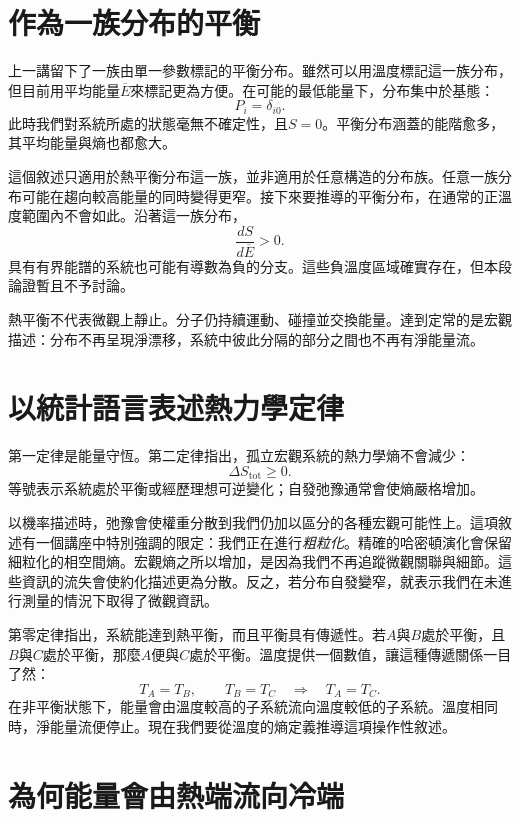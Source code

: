\section{作為一族分布的平衡}

上一講留下了一族由單一參數標記的平衡分布。雖然可以用溫度標記這一族分布，但目前用平均能量\(\overline E\)來標記更為方便。在可能的最低能量下，分布集中於基態：\[
 P_i=\delta_{i0}.
\]此時我們對系統所處的狀態毫無不確定性，且\(S=0\)。平衡分布涵蓋的能階愈多，其平均能量與熵也都愈大。

這個敘述只適用於熱平衡分布這一族，並非適用於任意構造的分布族。任意一族分布可能在趨向較高能量的同時變得更窄。接下來要推導的平衡分布，在通常的正溫度範圍內不會如此。沿著這一族分布，\begin{equation}
 \frac{dS}{d\overline E}>0.
 \label{eq:sm3-positive-temperature-branch}
\end{equation}具有有界能譜的系統也可能有導數為負的分支。這些負溫度區域確實存在，但本段論證暫且不予討論。

熱平衡不代表微觀上靜止。分子仍持續運動、碰撞並交換能量。達到定常的是宏觀描述：分布不再呈現淨漂移，系統中彼此分隔的部分之間也不再有淨能量流。

\section{以統計語言表述熱力學定律}

第一定律是能量守恆。第二定律指出，孤立宏觀系統的熱力學熵不會減少：\begin{equation}
 \Delta S_{\mathrm{tot}}\geq0.
 \label{eq:sm3-second-law}
\end{equation}等號表示系統處於平衡或經歷理想可逆變化；自發弛豫通常會使熵嚴格增加。

以機率描述時，弛豫會使權重分散到我們仍加以區分的各種宏觀可能性上。這項敘述有一個講座中特別強調的限定：我們正在進行\emph{粗粒化}。精確的哈密頓演化會保留細粒化的相空間熵。宏觀熵之所以增加，是因為我們不再追蹤微觀關聯與細節。這些資訊的流失會使約化描述更為分散。反之，若分布自發變窄，就表示我們在未進行測量的情況下取得了微觀資訊。

第零定律指出，系統能達到熱平衡，而且平衡具有傳遞性。若\(A\)與\(B\)處於平衡，且\(B\)與\(C\)處於平衡，那麼\(A\)便與\(C\)處於平衡。溫度提供一個數值，讓這種傳遞關係一目了然：\[
 T_A=T_B,\qquad T_B=T_C
 \quad\Longrightarrow\quad
 T_A=T_C.
\]在非平衡狀態下，能量會由溫度較高的子系統流向溫度較低的子系統。溫度相同時，淨能量流便停止。現在我們要從溫度的熵定義推導這項操作性敘述。

\section{為何能量會由熱端流向冷端}

